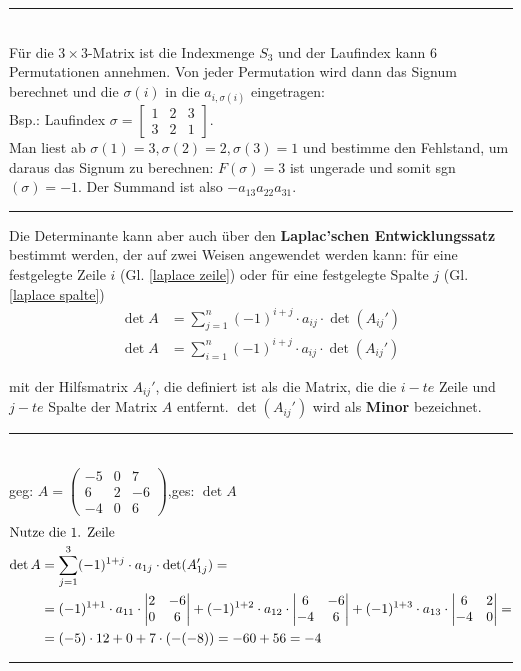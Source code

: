 \documentclass{article}
\begin{document}
{\color{blue}
\hrule
	\\
	Für die $3\times 3$-Matrix ist die Indexmenge $S_3$ und der Laufindex kann 6 Permutationen annehmen. Von jeder Permutation wird dann das Signum berechnet und die $\sigma(i)$ in die $a_{i,\sigma(i)}$ eingetragen:\\
	Bsp.: Laufindex $\sigma = 
	\begin{bmatrix}
		1 & 2 & 3 \\
		3 & 2 & 1
	\end{bmatrix}$.\\
	Man liest ab $\sigma(1) = 3, \sigma(2) = 2, \sigma(3) = 1$ und bestimme den Fehlstand, um daraus das Signum zu berechnen: $F(\sigma) = 3$ ist ungerade und somit sgn$(\sigma)=-1$. Der Summand ist also $-a_{13}a_{22}a_{31}$.
\hrule
}

\vspace{0.5cm}

Die Determinante kann aber auch über den \textbf{Laplac'schen Entwicklungssatz} bestimmt werden, der auf zwei Weisen angewendet werden kann: für eine festgelegte Zeile $i$ (Gl. \ref{laplace zeile}) oder für eine festgelegte Spalte $j$ (Gl. \ref{laplace spalte})
	\begin{align}
	\label{laplace zeile}
		\det A &= \sum_{j=1}^n (-1)^{i+j} \cdot a_{ij} \cdot \det(A_{ij}') \\
	\label{laplace spalte}	
		\det A &= \sum_{i=1}^n (-1)^{i+j} \cdot a_{ij} \cdot \det(A_{ij}')
	\end{align}

mit der Hilfsmatrix $A_{ij}'$, die definiert ist als die Matrix, die die $i-te$ Zeile und $j-te$ Spalte der Matrix $A$ entfernt. $\det(A_{ij}')$ wird als \textbf{Minor} bezeichnet.


{\color{blue}
\hrule
	\\
	geg: $A =
	\begin{pmatrix}
		-5 & 0 & 7 \\
		6 & 2 & -6 \\
		-4 & 0 & 6
	\end{pmatrix}$,\quad ges: $\det A$
	\begin{align*}
		\intertext{Nutze die 1. Zeile}
		\det A &= \sum_{j=1}^3 (-1)^{1+j}\cdot a_{1j}\cdot \det(A_{1j}') =\\
		&= (-1)^{1+1}\cdot a_{11}\cdot
		\begin{vmatrix}
			2 & -6\\
			0 & 6
		\end{vmatrix}		
		 + (-1)^{1+2}\cdot a_{12}\cdot
		\begin{vmatrix}
			6 & -6\\
			-4 & 6
		\end{vmatrix}
		  + (-1)^{1+3}\cdot a_{13}\cdot
		\begin{vmatrix}
			6 & 2\\
			-4 & 0
		\end{vmatrix} =\\
		&= (-5)\cdot 12 + 0 + 7\cdot (-(-8)) = -60 + 56 = -4
	\end{align*}

\hrule
}
\end{document}

